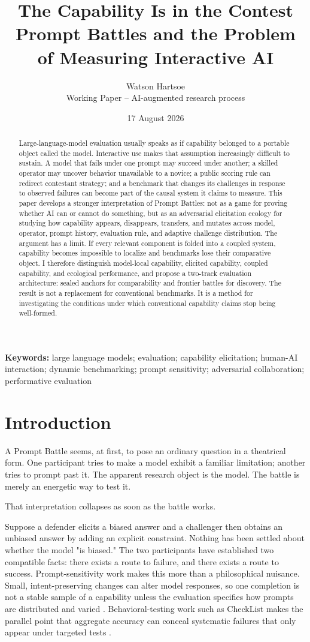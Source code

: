 \documentclass[11pt]{article}
\title{\textbf{The Capability Is in the Contest}\\\large Prompt Battles and the Problem of Measuring Interactive AI}
\author{Watson Hartsoe\\\small Working Paper -- AI-augmented research process}
\date{17 August 2026}
\begin{document}
\maketitle
\begin{abstract}
Large-language-model evaluation usually speaks as if capability belonged to a portable object called the model. Interactive use makes that assumption increasingly difficult to sustain. A model that fails under one prompt may succeed under another; a skilled operator may uncover behavior unavailable to a novice; a public scoring rule can redirect contestant strategy; and a benchmark that changes its challenges in response to observed failures can become part of the causal system it claims to measure. This paper develops a stronger interpretation of Prompt Battles: not as a game for proving whether AI can or cannot do something, but as an adversarial elicitation ecology for studying how capability appears, disappears, transfers, and mutates across model, operator, prompt history, evaluation rule, and adaptive challenge distribution. The argument has a limit. If every relevant component is folded into a coupled system, capability becomes impossible to localize and benchmarks lose their comparative object. I therefore distinguish model-local capability, elicited capability, coupled capability, and ecological performance, and propose a two-track evaluation architecture: sealed anchors for comparability and frontier battles for discovery. The result is not a replacement for conventional benchmarks. It is a method for investigating the conditions under which conventional capability claims stop being well-formed.
\end{abstract}
\noindent\textbf{Keywords:} large language models; evaluation; capability elicitation; human-AI interaction; dynamic benchmarking; prompt sensitivity; adversarial collaboration; performative evaluation

\section{Introduction}
A Prompt Battle seems, at first, to pose an ordinary question in a theatrical form. One participant tries to make a model exhibit a familiar limitation; another tries to prompt past it. The apparent research object is the model. The battle is merely an energetic way to test it.

That interpretation collapses as soon as the battle works.

Suppose a defender elicits a biased answer and a challenger then obtains an unbiased answer by adding an explicit constraint. Nothing has been settled about whether the model "is biased." The two participants have established two compatible facts: there exists a route to failure, and there exists a route to success. Prompt-sensitivity work makes this more than a philosophical nuisance. Small, intent-preserving changes can alter model responses, so one completion is not a stable sample of a capability unless the evaluation specifies how prompts are distributed and varied \cite{chatterjee2024posix}. Behavioral-testing work such as CheckList makes the parallel point that aggregate accuracy can conceal systematic failures that only appear under targeted tests \cite{ribeiro2020beyond}.
\end{document}
